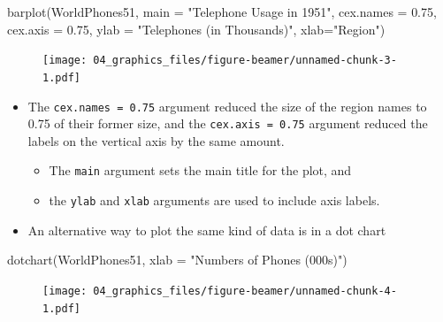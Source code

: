 \documentclass[
  9pt,
  a4paper,
  ignorenonframetext,
  notheorems]{beamer}
\newenvironment{Shaded}{\begin{snugshade}}{\end{snugshade}}
\newcommand{\AttributeTok}[1]{\textcolor[rgb]{0.40,0.45,0.13}{#1}}
\newcommand{\FloatTok}[1]{\textcolor[rgb]{0.68,0.00,0.00}{#1}}
\newcommand{\FunctionTok}[1]{\textcolor[rgb]{0.28,0.35,0.67}{#1}}
\newcommand{\NormalTok}[1]{\textcolor[rgb]{0.00,0.23,0.31}{#1}}
\newcommand{\StringTok}[1]{\textcolor[rgb]{0.13,0.47,0.30}{#1}}
\providecommand{\tightlist}{%
  \setlength{\itemsep}{0pt}\setlength{\parskip}{0pt}}\usepackage{longtable,booktabs,array}
\begin{document}
\begin{frame}[fragile]
\begin{Shaded}
\begin{Highlighting}[]
\FunctionTok{barplot}\NormalTok{(WorldPhones51, }\AttributeTok{main =} \StringTok{"Telephone Usage in 1951"}\NormalTok{, }\AttributeTok{cex.names =} \FloatTok{0.75}\NormalTok{, }
        \AttributeTok{cex.axis =} \FloatTok{0.75}\NormalTok{, }\AttributeTok{ylab =} \StringTok{"Telephones (in Thousands)"}\NormalTok{, }\AttributeTok{xlab=}\StringTok{"Region"}\NormalTok{)}
\end{Highlighting}
\end{Shaded}

\begin{figure}

{\centering \texttt{[image: 04\_graphics\_files/figure-beamer/unnamed-chunk-3-1.pdf]}

}

\end{figure}

\begin{itemize}
\tightlist
\item
  The \texttt{cex.names\ =\ 0.75} argument reduced the size of the
  region names to 0.75 of their former size, and the
  \texttt{cex.axis\ =\ 0.75} argument reduced the labels on the vertical
  axis by the same amount.

  \begin{itemize}
  \tightlist
  \item
    The \texttt{main} argument sets the main title for the plot, and
  \item
    the \texttt{ylab} and \texttt{xlab} arguments are used to include
    axis labels.
  \end{itemize}
\end{itemize}
\end{frame}

\begin{frame}[fragile]
\begin{itemize}
\tightlist
\item
  An alternative way to plot the same kind of data is in a dot chart
\end{itemize}

\begin{Shaded}
\begin{Highlighting}[]
\FunctionTok{dotchart}\NormalTok{(WorldPhones51, }\AttributeTok{xlab =} \StringTok{"Numbers of Phones (\textquotesingle{}000s)"}\NormalTok{)}
\end{Highlighting}
\end{Shaded}

\begin{figure}

{\centering \texttt{[image: 04\_graphics\_files/figure-beamer/unnamed-chunk-4-1.pdf]}

}

\end{figure}
\end{frame}
\end{document}
